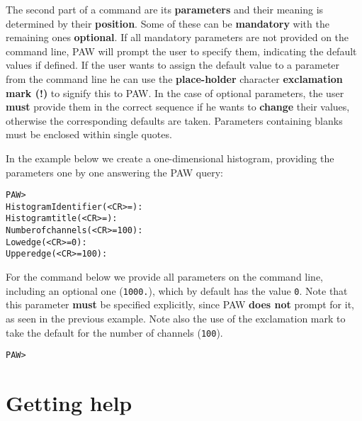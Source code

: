 The second part of a command are its {\bf parameters} and their meaning
is determined by their {\bf position}.
Some of these can be {\bf mandatory}
with the remaining ones {\bf optional}.
If all mandatory parameters are not provided on the command line,
PAW will prompt the user to specify them, indicating
the default values if defined.
If the user wants
to assign the default value to a parameter from the command line
he can use the {\bf place-holder} character
{\bf exclamation mark (!)} to signify this to PAW.
In the case of optional parameters, the user {\bf must} provide them
in the correct sequence if he wants to {\bf change} their values,
otherwise the corresponding defaults are taken.
Parameters containing blanks must be enclosed within single quotes.
 
In the example below we create a one-dimensional histogram,
providing the parameters one by one answering the PAW query:
\begin{alltt}
      PAW > 
      Histogram Identifier (<CR>= ): 
      Histogram title (<CR>= ): 
      Number of channels (<CR>=100): 
      Low edge (<CR>=0): 
      Upper edge (<CR>=100): 
\end{alltt}
For the command below
we provide all parameters on the command line, including
an optional one (\texttt{1000.}),
which by default has the value \texttt{0}.
Note that this parameter {\bf must} be specified
explicitly, since PAW {\bf does not} prompt for it,
as seen in the previous example.
Note also the use of the exclamation mark to take the default for the
number of channels (\texttt{100}).
\begin{alltt}
      PAW > 
\end{alltt}

\section{Getting help}
\label{sec:GETHELP}
 
